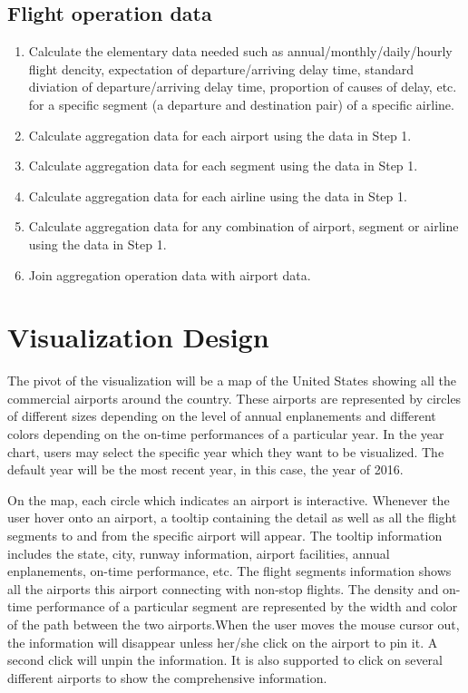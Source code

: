 \documentclass[12pt]{article}
\begin{document}
    \subsection{Flight operation data}
    \begin{enumerate}
    \item Calculate the elementary data needed such as annual/monthly/daily/hourly flight dencity, expectation of departure/arriving delay time, standard diviation of departure/arriving delay time, proportion of causes of delay, etc. for a specific segment (a departure and destination pair) of a specific airline.
    \item Calculate aggregation data for each airport using the data in Step 1.
    \item Calculate aggregation data for each segment using the data in Step 1.
    \item Calculate aggregation data for each airline using the data in Step 1.
    \item Calculate aggregation data for any combination of airport, segment or airline using the data in Step 1.
    \item Join aggregation operation data with airport data.
    \end{enumerate}

\section{Visualization Design}

The pivot of the visualization will be a map of the United States showing all the commercial airports around the country. These airports are represented by circles of different sizes depending on the level of annual enplanements and different colors depending on the on-time performances of a particular year. In the year chart, users may select the specific year which they want to be visualized. The default year will be the most recent year, in this case, the year of 2016.

On the map, each circle which indicates an airport is interactive. Whenever the user hover onto an airport, a tooltip containing the detail as well as all the flight segments to and from the specific airport will appear. The tooltip information includes the state, city, runway information, airport facilities, annual enplanements, on-time performance, etc. The flight segments information shows all the airports this airport connecting with non-stop flights. The density and on-time performance of a particular segment are represented by the width and color of the path between the two airports.When the user moves the mouse cursor out, the information will disappear unless her/she click on the airport to pin it. A second click will unpin the information. It is also supported to click on several different airports to show the comprehensive information.
\end{document}
